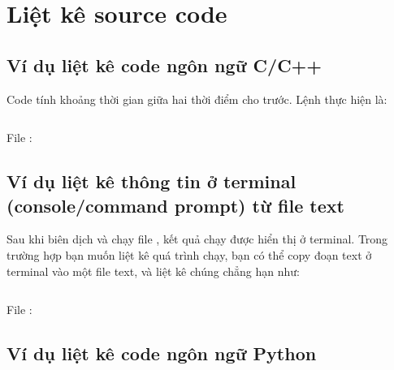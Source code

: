 
\chapter{Liệt kê source code} %

\label{AppendixB} %


\section{Ví dụ liệt kê code ngôn ngữ C/C++}

Code tính khoảng thời gian giữa hai thời điểm cho trước. Lệnh thực hiện là:
\begin{Verbatim}

\end{Verbatim}

File :




\section{Ví dụ liệt kê thông tin ở terminal (console/command prompt) từ file text}

Sau khi biên dịch và chạy file , kết quả chạy được hiển thị ở terminal. Trong trường hợp bạn muốn liệt kê quá trình chạy, bạn có thể copy đoạn text ở terminal vào một file text, và liệt kê chúng chẳng hạn như:
\begin{Verbatim}

\end{Verbatim}

File :




\section{Ví dụ liệt kê code ngôn ngữ Python}

